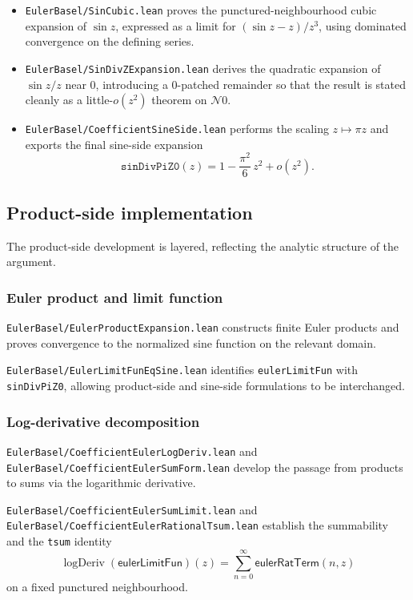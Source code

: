 \documentclass[11pt,a4paper]{article}
\theoremstyle{plain}
\theoremstyle{definition}
\DeclareRobustCommand{\codepath}[1]{\nolinkurl{#1}}
\newcommand{\nhds}{\ensuremath{\mathcal{N}}}
\DeclareRobustCommand{\leanid}[1]{\texttt{#1}}
\DeclareRobustCommand{\codepath}[1]{\nolinkurl{#1}}
\newcommand{\sinDivPiZZero}{\leanid{sinDivPiZ0}}
\newcommand{\eulerLimitFun}{\ensuremath{\mathsf{eulerLimitFun}}}
\DeclareMathOperator{\logDeriv}{logDeriv}
\begin{document}
\begin{itemize}[leftmargin=2em]
  \item \texttt{EulerBasel/SinCubic.lean} proves the punctured-neighbourhood cubic expansion of \(\sin z\), expressed as a limit for \((\sin z - z)/z^{3}\), using dominated convergence on the defining series.

  \item \texttt{EulerBasel/SinDivZExpansion.lean} derives the quadratic expansion of \(\sin z / z\) near \(0\), introducing a $0$-patched remainder so that the result is stated cleanly as a little-\(o(z^{2})\) theorem on \(\nhds 0\).

  \item \texttt{EulerBasel/CoefficientSineSide.lean} performs the scaling \(z \mapsto \pi z\) and exports the final sine-side expansion
  \[
  \sinDivPiZZero(z)
  =
  1 - \frac{\pi^{2}}{6}\, z^{2}
  + o(z^{2}).
  \]
\end{itemize}

\subsection{Product-side implementation}

The product-side development is layered, reflecting the analytic structure of the argument.

\subsubsection{Euler product and limit function}

\texttt{EulerBasel/EulerProductExpansion.lean}
constructs finite Euler products and proves convergence to the normalized sine function on the relevant domain.

\codepath{EulerBasel/EulerLimitFunEqSine.lean}
identifies \leanid{eulerLimitFun} with \sinDivPiZZero, allowing product-side and sine-side formulations to be interchanged.

\subsubsection{Log-derivative decomposition}

\codepath{EulerBasel/CoefficientEulerLogDeriv.lean} and
\codepath{EulerBasel/CoefficientEulerSumForm.lean}
develop the passage from products to sums via the logarithmic derivative.

\codepath{EulerBasel/CoefficientEulerSumLimit.lean} and
\codepath{EulerBasel/CoefficientEulerRationalTsum.lean}
establish the summability and the \texttt{tsum} identity
\[
\logDeriv(\eulerLimitFun)(z)
=
\sum_{n=0}^{\infty} \mathsf{eulerRatTerm}(n,z)
\]
on a fixed punctured neighbourhood.
\end{document}
